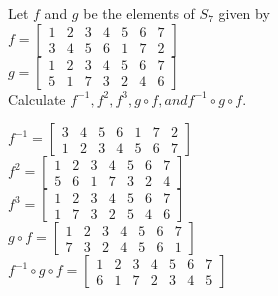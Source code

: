 \begin{question}{6}
Let $f$ and $g$ be the elements of $S_7$ given by \\

$f= \begin{bmatrix}
1 & 2 & 3 & 4 & 5 & 6 & 7 \\
3 & 4 & 5 & 6 & 1 & 7 & 2
\end{bmatrix}
$\\

$g= \begin{bmatrix}
1 & 2 & 3 & 4 & 5 & 6 & 7 \\
5 & 1 & 7 & 3 & 2 & 4 & 6
\end{bmatrix}
$\\

Calculate $f^{-1}, f^2, f^3, g \circ f, and f^{-1} \circ g \circ f$.

$f^{-1}= \begin{bmatrix}
3 & 4 & 5 & 6 & 1 & 7 & 2 \\
1 & 2 & 3 & 4 & 5 & 6 & 7
\end{bmatrix}
$\\

$f^{2}= \begin{bmatrix}
1 & 2 & 3 & 4 & 5 & 6 & 7 \\
5 & 6 & 1 & 7 & 3 & 2 & 4
\end{bmatrix}
$\\

$f^{3}= \begin{bmatrix}
1 & 2 & 3 & 4 & 5 & 6 & 7 \\
1 & 7 & 3 & 2 & 5 & 4 & 6
\end{bmatrix}
$\\

$g \circ f = \begin{bmatrix}
1 & 2 & 3 & 4 & 5 & 6 & 7 \\
7 & 3 & 2 & 4 & 5 & 6 & 1
\end{bmatrix}
$\\

$f^{-1} \circ g \circ f = \begin{bmatrix}
1 & 2 & 3 & 4 & 5 & 6 & 7 \\
6 & 1 & 7 & 2 & 3 & 4 & 5
\end{bmatrix}
$\\
\end{question}

